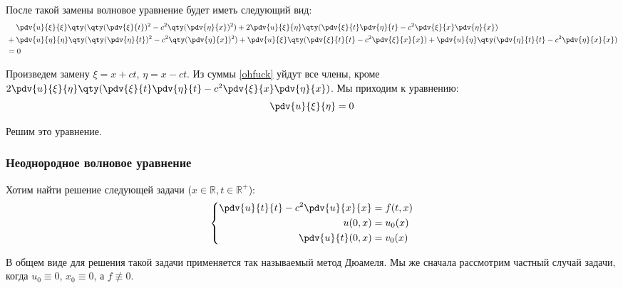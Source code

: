 После такой замены волновое уравнение будет иметь следующий вид:
\begin{equation}
  \begin{aligned}
    &\phantom{{}+{}} \pdv{u}{\xi}{\xi} \qty(\qty(\pdv{\xi}{t})^2 - c^2 \qty(\pdv{\eta}{x})^2) + 2 \pdv{u}{\xi}{\eta} \qty(\pdv{\xi}{t} \pdv{\eta}{t} - c^2 \pdv{\xi}{x} \pdv{\eta}{x}) \\
    &+ \pdv{u}{\eta}{\eta} \qty(\qty(\pdv{\eta}{t})^2 - c^2 \qty(\pdv{\eta}{x})^2) + \pdv{u}{\xi} \qty(\pdv{\xi}{t}{t} - c^2 \pdv{\xi}{x}{x}) + \pdv{u}{\eta} \qty(\pdv{\eta}{t}{t} - c^2 \pdv{\eta}{x}{x}) \\
    &= 0
  \end{aligned} \label{ohfuck}
\end{equation}


Произведем замену $\xi = x + ct$, $\eta = x - ct$. Из суммы \eqref{ohfuck} уйдут все члены, кроме $ 2 \pdv{u}{\xi}{\eta} \qty(\pdv{\xi}{t} \pdv{\eta}{t} - c^2 \pdv{\xi}{x} \pdv{\eta}{x})$. Мы  приходим к уравнению:
\begin{equation}
  \pdv{u}{\xi}{\eta} = 0
\end{equation}

Решим это уравнение. 

\bigskip
{}
\bigskip

\subsubsection{Неоднородное волновое уравнение}

Хотим найти решение следующей задачи ($x \in \mathbb{R}, t \in \mathbb{R}^+$):
%
\begin{equation}
  \left\{\begin{aligned}
    \pdv{u}{t}{t} - c^2 \pdv{u}{x}{x} &= f(t, x) \\
    u(0, x) &= u_0(x) \\
    \pdv{u}{t} (0, x) &= v_0(x)
  \end{aligned}\right. \label{problem1_3_5}
\end{equation}

В общем виде для решения такой задачи применяется так называемый метод Дюамеля. Мы же сначала рассмотрим частный случай задачи, когда $u_0 \equiv 0$, $x_0 \equiv 0$, а $f \not\equiv 0$.

